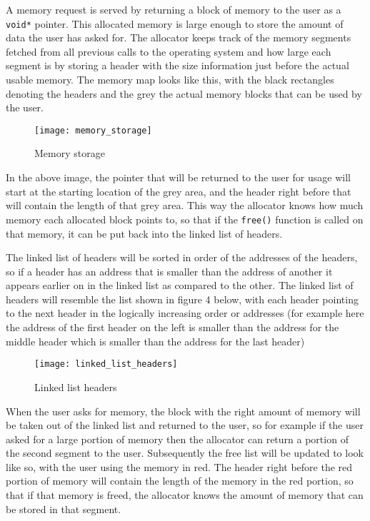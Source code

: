 \documentclass{article}
\begin{document}
A memory request is served by returning a block of memory to the user as a
\texttt{void*} pointer.  This allocated memory is large enough to store the
amount of data the user has asked for.  The allocator keeps track of the
memory segments fetched from all previous calls to the operating system and
how large each segment is by storing a header with the size information just
before the actual usable memory.  The memory map looks like this, with the
black rectangles denoting the headers and the grey the actual memory blocks
that can be used by the user.

\begin{figure}[!htb]
\centering
\texttt{[image: memory\_storage]}
\caption{Memory storage}
\end{figure}

In the above image, the pointer that will be returned to the user for usage
will start at the starting location of the grey area, and the header right
before that will contain the length of that grey area.  This way the allocator
knows how much memory each allocated block points to, so that if the
\texttt{free()} function is called on that memory, it can be put back into the
linked list of headers.

The linked list of headers will be sorted in order of the addresses of the
headers, so if a header has an address that is smaller than the address of
another it appears earlier on in the linked list as compared to the other.
The linked list of headers will resemble the list shown in figure 4 below,
with each header pointing to the next header in the logically increasing order
or addresses (for example here the address of the first header on the left is
smaller than the address for the middle header which is smaller than the
address for the last header)

\begin{figure}[!htb]
\centering
\texttt{[image: linked\_list\_headers]}
\caption{Linked list headers}
\end{figure}

When the user asks for memory, the block with the right amount of memory will
be taken out of the linked list and returned to the user, so for example if
the user asked for a large portion of memory then the allocator can
return a portion of the second segment to the user.  Subsequently the free
list will be updated to look like so, with the user using the memory in red.
The header right before the red portion of memory will contain the length of
the memory in the red portion, so that if that memory is freed, the allocator
knows the amount of memory that can be stored in that segment.
\end{document}
